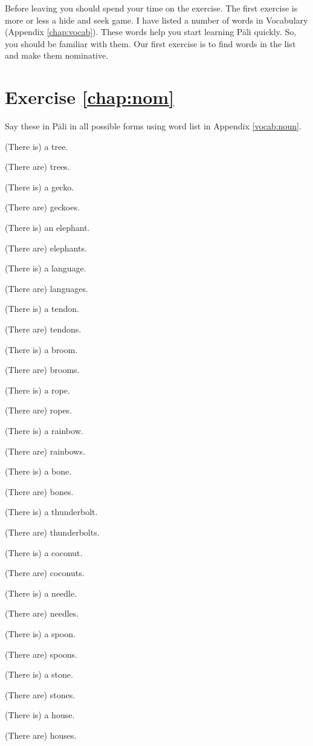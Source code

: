 Before leaving you should spend your time on the exercise. The first exercise is more or less a hide and seek game. I have listed a number of words in Vocabulary (Appendix \ref{chap:vocab}). These words help you start learning P\=ali quickly. So, you should be familiar with them. Our first exercise is to find words in the list and make them nominative.

\section*{Exercise \ref{chap:nom}}
Say these in P\=ali in all possible forms using word list in Appendix \ref{vocab:noun}.
\begin{multicols}{2}
\RaggedRight
\begin{compactenum}
\item (There is) a tree.
\item (There are) trees.
\item (There is) a gecko.
\item (There are) geckoes.
\item (There is) an elephant.
\item (There are) elephants.
\item (There is) a language.
\item (There are) languages.
\item (There is) a tendon.
\item (There are) tendons.
\item (There is) a broom.
\item (There are) brooms.
\item (There is) a rope.
\item (There are) ropes.
\item (There is) a rainbow.
\item (There are) rainbows.
\item (There is) a bone.
\item (There are) bones.
\item (There is) a \mbox{thunderbolt}.
\item (There are) \mbox{thunderbolts}.
\item (There is) a coconut.
\item (There are) coconuts.
\item (There is) a needle.
\item (There are) needles.
\item (There is) a spoon.
\item (There are) spoons.
\item (There is) a stone.
\item (There are) stones.
\item (There is) a house.
\item (There are) houses.
\end{compactenum}
\end{multicols}
